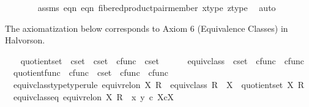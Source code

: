 \begin{isabellebody}
\ \ \ \ \ \ \isamarkupfalse%
\ assms\ eqn{}\ eqn{}\ fibered{\isacharunderscore}{\kern0pt}product{\isacharunderscore}{\kern0pt}pair{\isacharunderscore}{\kern0pt}member\ x{\isacharunderscore}{\kern0pt}type\ z{\isacharunderscore}{\kern0pt}type\ \isamarkupfalse%
\ auto\isanewline
\ \ \isamarkupfalse%
\isanewline
{}\isamarkupfalse%
%
\endisatagproof
{\isafoldproof}%
%
\isadelimproof
%
\endisadelimproof
%
\begin{isamarkuptext}%
The axiomatization below corresponds to Axiom 6 (Equivalence Classes) in Halvorson.%
\end{isamarkuptext}\isamarkuptrue%
\isamarkupfalse%
\ \isanewline
\ \ quotient{\isacharunderscore}{\kern0pt}set\ {\isacharcolon}{\kern0pt}{\isacharcolon}{\kern0pt}\ {\isachardoublequoteopen}cset\ {\isasymRightarrow}\ {\isacharparenleft}{\kern0pt}cset\ {\isasymtimes}\ cfunc{\isacharparenright}{\kern0pt}\ {\isasymRightarrow}\ cset{\isachardoublequoteclose}\ {\isacharparenleft}{\kern0pt}\ {\isachardoublequoteopen}{\isasymsslash}{\isachardoublequoteclose}\ {}{}{\isacharparenright}{\kern0pt}\ \isanewline
\ \ equiv{\isacharunderscore}{\kern0pt}class\ {\isacharcolon}{\kern0pt}{\isacharcolon}{\kern0pt}\ {\isachardoublequoteopen}cset\ {\isasymtimes}\ cfunc\ {\isasymRightarrow}\ cfunc{\isachardoublequoteclose}\ \isanewline
\ \ quotient{\isacharunderscore}{\kern0pt}func\ {\isacharcolon}{\kern0pt}{\isacharcolon}{\kern0pt}\ {\isachardoublequoteopen}cfunc\ {\isasymRightarrow}\ cset\ {\isasymtimes}\ cfunc\ {\isasymRightarrow}\ cfunc{\isachardoublequoteclose}\isanewline
{}\isanewline
\ \ equiv{\isacharunderscore}{\kern0pt}class{\isacharunderscore}{\kern0pt}type{\isacharbrackleft}{\kern0pt}type{\isacharunderscore}{\kern0pt}rule{\isacharbrackright}{\kern0pt}{\isacharcolon}{\kern0pt}\ {\isachardoublequoteopen}equiv{\isacharunderscore}{\kern0pt}rel{\isacharunderscore}{\kern0pt}on\ X\ R\ {\isasymLongrightarrow}\ equiv{\isacharunderscore}{\kern0pt}class\ R\ {\isacharcolon}{\kern0pt}\ X\ {\isasymrightarrow}\ quotient{\isacharunderscore}{\kern0pt}set\ X\ R{\isachardoublequoteclose}\ \isanewline
\ \ equiv{\isacharunderscore}{\kern0pt}class{\isacharunderscore}{\kern0pt}eq{\isacharcolon}{\kern0pt}\ {\isachardoublequoteopen}equiv{\isacharunderscore}{\kern0pt}rel{\isacharunderscore}{\kern0pt}on\ X\ R\ {\isasymLongrightarrow}\ {\isasymlangle}x{\isacharcomma}{\kern0pt}\ y{\isasymrangle}\ {\isasymin}\isactrlsub c\ X{\isasymtimes}\isactrlsub cX\ {\isasymLongrightarrow}\isanewline

\end{isabellebody}
